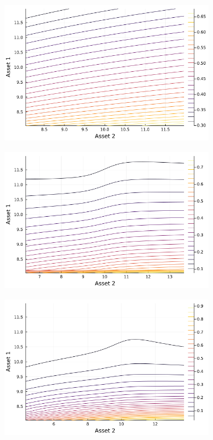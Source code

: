\documentclass{article}
\begin{document}
\begin{figure}
    \centering
    \begin{subfigure}{0.4\textwidth}
        \includegraphics[width=\textwidth]{../plots/params/baseline/b22.png}
        \end{subfigure}
    \begin{subfigure}{0.4\textwidth}
        \includegraphics[width=\textwidth]{../plots/params/a2-mean-shift/b22.png}
    \end{subfigure}
    \begin{subfigure}{0.4\textwidth}
        \includegraphics[width=\textwidth]{../plots/params/a2-meanvar-shift/b22.png}

\end{subfigure}
\end{figure}
\end{document}
